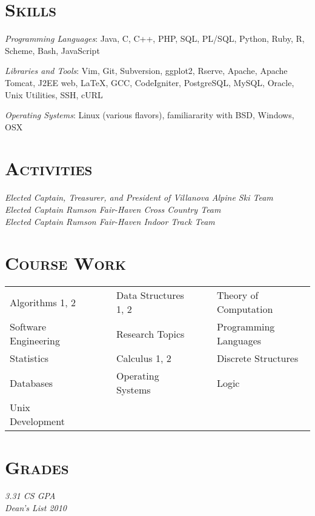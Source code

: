 \documentclass[line,margin]{resume}
\begin{document}
\begin{resume}

\section{\textsc{Skills}}

\emph{Programming Languages}: Java, C, C++, PHP, SQL, PL/SQL, Python, Ruby, R,
Scheme, Bash, JavaScript

\emph{Libraries and Tools}: Vim, Git, Subversion, ggplot2, Rserve, Apache,
Apache Tomcat, J2EE web, LaTeX, GCC, CodeIgniter, PostgreSQL, MySQL,
Oracle, Unix Utilities, SSH, cURL

\emph{Operating Systems}: Linux (various flavors), familiararity with BSD,
Windows, OSX


\section{\textsc{Activities}}

\emph{Elected Captain, Treasurer, and President of Villanova Alpine Ski Team} \\
\emph{Elected Captain Rumson Fair-Haven Cross Country Team} \\
\emph{Elected Captain Rumson Fair-Haven Indoor Track Team} \\


\section{\textsc{Course Work}}
  \begin{tabular}{lllll}

  Algorithms 1, 2        & \ \ & Data Structures 1, 2& \ \ & Theory of Computation \\
  Software Engineering   & \ \ & Research Topics     & \ \ & Programming Languages \\
  Statistics             & \ \ & Calculus 1, 2       & \ \ & Discrete Structures \\
  Databases              & \ \ & Operating Systems   & \ \ & Logic \\
  Unix Development       & \ \ &

  \end{tabular}

\section{\textsc{Grades}}
\emph{3.31 CS GPA} \\
\emph{Dean's List 2010}

\end{resume}
\end{document}

